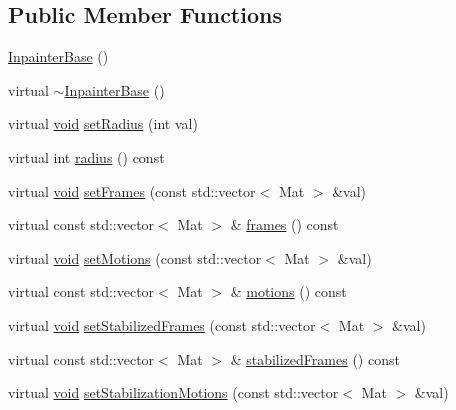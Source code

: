 \subsection*{Public Member Functions}
\begin{DoxyCompactItemize}
\item 
\hyperlink{classcv_1_1videostab_1_1InpainterBase_a74429e890d897eb24d38087b253ea727}{Inpainter\-Base} ()
\item 
virtual \hyperlink{classcv_1_1videostab_1_1InpainterBase_af17e46d41bad73d1be17312ff42b6d39}{$\sim$\-Inpainter\-Base} ()
\item 
virtual \hyperlink{legacy_8hpp_a8bb47f092d473522721002c86c13b94e}{void} \hyperlink{classcv_1_1videostab_1_1InpainterBase_ae2bfdae38decac0507ae942294b686b8}{set\-Radius} (int val)
\item 
virtual int \hyperlink{classcv_1_1videostab_1_1InpainterBase_aeb52fd6e95176f556613d0ef381a8844}{radius} () const 
\item 
virtual \hyperlink{legacy_8hpp_a8bb47f092d473522721002c86c13b94e}{void} \hyperlink{classcv_1_1videostab_1_1InpainterBase_a9c9c42ea041ec6e67db0041df4e022c8}{set\-Frames} (const std\-::vector$<$ Mat $>$ \&val)
\item 
virtual const std\-::vector$<$ Mat $>$ \& \hyperlink{classcv_1_1videostab_1_1InpainterBase_add3fefa6cb0cd3edbd1a7fe6f0881dd0}{frames} () const 
\item 
virtual \hyperlink{legacy_8hpp_a8bb47f092d473522721002c86c13b94e}{void} \hyperlink{classcv_1_1videostab_1_1InpainterBase_a91ea73b4944c3f852ae48dff5cc48557}{set\-Motions} (const std\-::vector$<$ Mat $>$ \&val)
\item 
virtual const std\-::vector$<$ Mat $>$ \& \hyperlink{classcv_1_1videostab_1_1InpainterBase_a6bd597ca7bb4dab97f4e4a6a73e56ee2}{motions} () const 
\item 
virtual \hyperlink{legacy_8hpp_a8bb47f092d473522721002c86c13b94e}{void} \hyperlink{classcv_1_1videostab_1_1InpainterBase_af358007841909b089eb568ac9eb76a79}{set\-Stabilized\-Frames} (const std\-::vector$<$ Mat $>$ \&val)
\item 
virtual const std\-::vector$<$ Mat $>$ \& \hyperlink{classcv_1_1videostab_1_1InpainterBase_a4f4679b3a4d671af3915334e4d770b45}{stabilized\-Frames} () const 
\item 
virtual \hyperlink{legacy_8hpp_a8bb47f092d473522721002c86c13b94e}{void} \hyperlink{classcv_1_1videostab_1_1InpainterBase_a68bc03d322d17c9de5bf443b288070e7}{set\-Stabilization\-Motions} (const std\-::vector$<$ Mat $>$ \&val)

\end{DoxyCompactItemize}
